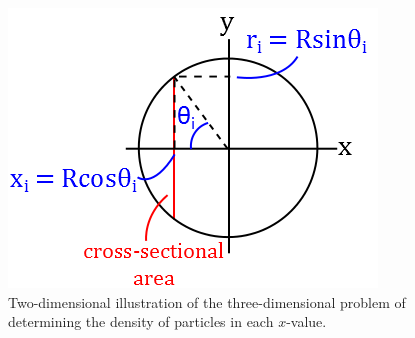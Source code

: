 \begin{figure}
\centering
	\includegraphics[width=1\linewidth]{Figures/Cross_sectional_area.png}
\caption{
Two-dimensional illustration of the three-dimensional problem of determining the density of particles in each $x$-value.
}
\label{fig:Cross_sectional_area}
\end{figure}

